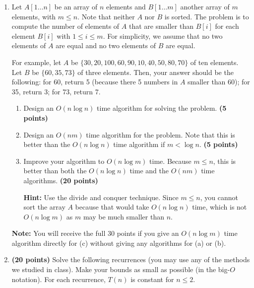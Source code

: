 \documentclass[11pt]{article}
\begin{document}
\begin{enumerate}
\begin{enumerate}
\begin{description}
\end{description}

\end{enumerate}

\item %

Let $A[1\ldots n]$ be an array of $n$ elements and $B[1\ldots m]$ another array of $m$ elements, with $m\leq n$. Note that neither $A$ nor $B$ is sorted. The problem is to compute the number of elements of $A$ that are smaller than $B[i]$ for each element $B[i]$ with $1\leq i\leq m$.
For simplicity, we assume that no two elements of $A$ are equal and no two elements of $B$ are equal.

For example, let $A$ be $\{30, 20, 100, 60, 90, 10, 40, 50, 80, 70\}$ of ten elements. Let $B$ be $\{60, 35, 73\}$ of three elements. Then, your answer should be the following: for 60, return 5 (because there 5 numbers in $A$ smaller than 60); for 35, return 3; for 73, return 7.

\begin{enumerate}
\item
Design an $O(n\log n)$ time algorithm for solving the problem. {\hfill \bf (5 points)}

\item
Design an $O(nm)$ time algorithm for the problem. Note that this is better than the $O(n\log n)$ time algorithm if $m<\log n$. {\hfill \bf (5 points)}

\item
Improve your algorithm to $O(n\log m)$ time. Because $m\leq n$, this is better than both the $O(n\log n)$ time and the $O(nm)$ time algorithms. {\hfill \bf (20 points)}


{\bf Hint:} Use the divide and conquer technique. Since $m\leq n$, you cannot sort the array $A$ because that would take $O(n\log n)$ time, which is not $O(n\log m)$ as $m$ may be much smaller than $n$.
\end{enumerate}


{\bf Note:}
You will receive the full 30 points if you give an $O(n\log m)$ time algorithm directly for (c) without giving any algorithms for (a) or (b).


\item %
{\bf (20 points)}
Solve the following recurrences (you may use any of the methods we studied in class). Make your bounds as small as possible (in the big-$O$ notation). For each recurrence, $T(n)$ is constant for $n\leq 2$.

\begin{enumerate}


\end{enumerate}
\end{enumerate}
\end{document}
